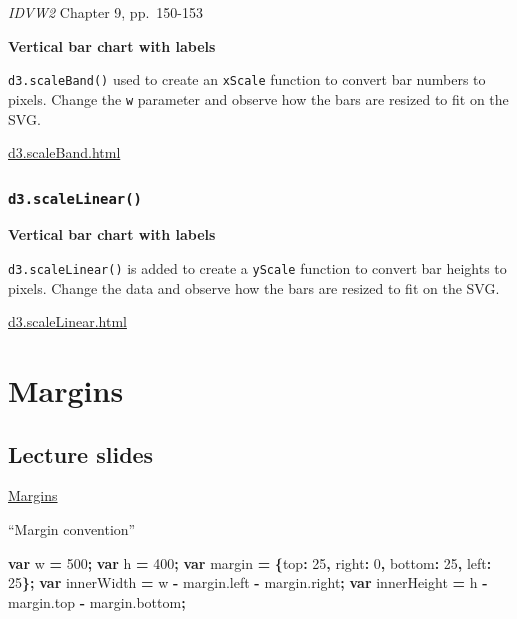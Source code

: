 \documentclass[openany]{book}
\newenvironment{Shaded}{\begin{snugshade}}{\end{snugshade}}
\newcommand{\AttributeTok}[1]{\textcolor[rgb]{0.77,0.63,0.00}{#1}}
\newcommand{\DataTypeTok}[1]{\textcolor[rgb]{0.13,0.29,0.53}{#1}}
\newcommand{\DecValTok}[1]{\textcolor[rgb]{0.00,0.00,0.81}{#1}}
\newcommand{\KeywordTok}[1]{\textcolor[rgb]{0.13,0.29,0.53}{\textbf{#1}}}
\newcommand{\NormalTok}[1]{#1}
\newcommand{\OperatorTok}[1]{\textcolor[rgb]{0.81,0.36,0.00}{\textbf{#1}}}
\newcommand{\VariableTok}[1]{\textcolor[rgb]{0.00,0.00,0.00}{#1}}
\begin{document}
\emph{IDVW2} Chapter 9, pp.~150-153

\textbf{Vertical bar chart with labels}

\texttt{d3.scaleBand()} used to create an \texttt{xScale} function to convert bar numbers to pixels. Change the \texttt{w} parameter and observe how the bars are resized to fit on the SVG.

\href{code/d3.scaleBand.html}{d3.scaleBand.html}

\hypertarget{d3.scalelinear}{%
\subsubsection*{\texorpdfstring{\texttt{d3.scaleLinear()}}{d3.scaleLinear()}}\label{d3.scalelinear}}

\textbf{Vertical bar chart with labels}

\texttt{d3.scaleLinear()} is added to create a \texttt{yScale} function to convert bar heights to pixels. Change the data and observe how the bars are resized to fit on the SVG.

\href{code/d3.scaleLinear.html}{d3.scaleLinear.html}

\hypertarget{margins}{%
\section{Margins}\label{margins}}

\hypertarget{lecture-slides-2}{%
\subsection{Lecture slides }\label{lecture-slides-2}}

\href{pdfs/margins.pdf}{Margins}

``Margin convention''

\begin{Shaded}
\begin{Highlighting}[]
  \KeywordTok{var}\NormalTok{ w }\OperatorTok{=} \DecValTok{500}\OperatorTok{;}
  \KeywordTok{var}\NormalTok{ h }\OperatorTok{=} \DecValTok{400}\OperatorTok{;}
  \KeywordTok{var}\NormalTok{ margin }\OperatorTok{=} \OperatorTok{\{}\DataTypeTok{top}\OperatorTok{:} \DecValTok{25}\OperatorTok{,} \DataTypeTok{right}\OperatorTok{:} \DecValTok{0}\OperatorTok{,} \DataTypeTok{bottom}\OperatorTok{:} \DecValTok{25}\OperatorTok{,} \DataTypeTok{left}\OperatorTok{:} \DecValTok{25}\OperatorTok{\};}
  \KeywordTok{var}\NormalTok{ innerWidth }\OperatorTok{=}\NormalTok{ w }\OperatorTok{-} \VariableTok{margin}\NormalTok{.}\AttributeTok{left} \OperatorTok{-} \VariableTok{margin}\NormalTok{.}\AttributeTok{right}\OperatorTok{;}
  \KeywordTok{var}\NormalTok{ innerHeight }\OperatorTok{=}\NormalTok{ h }\OperatorTok{-} \VariableTok{margin}\NormalTok{.}\AttributeTok{top} \OperatorTok{-} \VariableTok{margin}\NormalTok{.}\AttributeTok{bottom}\OperatorTok{;}
\end{Highlighting}
\end{Shaded}
\end{document}
